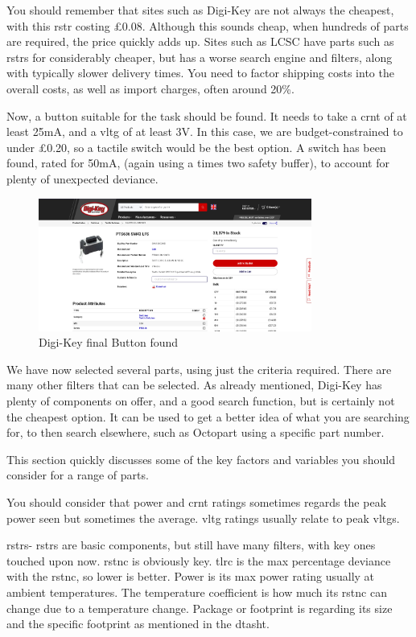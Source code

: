 \documentclass[a4paper,11pt]{report}
\begin{document}
You should remember that sites such as Digi-Key are not always the cheapest, with this \gls{rstr} costing £0.08. Although this sounds cheap, when hundreds of parts are required, the price quickly adds up. Sites such as LCSC have parts such as \gls{rstr}s for considerably cheaper, but has a worse search engine and filters, along with typically slower delivery times. You need to factor shipping costs into the overall costs, as well as import charges, often around 20\%.

Now, a button suitable for the task should be found. It needs to take a \gls{crnt} of at least 25mA, and a \gls{vltg} of at least 3V. In this case, we are budget-constrained to under £0.20, so a tactile switch would be the best option. A switch has been found, rated for 50mA, (again using a times two safety buffer), to account for plenty of unexpected deviance.

\begin{figure}[H]
\centering
\includegraphics[width=0.8\textwidth]{screenshots/DigiKeyButton}
\caption{Digi-Key final Button found}
\end{figure}

We have now selected several parts, using just the criteria required. There are many other filters that can be selected. As already mentioned, Digi-Key has plenty of components on offer, and a good search function, but is certainly not the cheapest option. It can be used to get a better idea of what you are searching for, to then search elsewhere, such as Octopart using a specific part number.

This section quickly discusses some of the key factors and variables you should consider for a range of parts.

You should consider that power and \gls{crnt} ratings sometimes regards the peak power seen but sometimes the average. \gls{vltg} ratings usually relate to peak \gls{vltg}s.

\gls{rstr}s- \gls{rstr}s are basic components, but still have many filters, with key ones touched upon now. \gls{rstnc} is obviously key. \gls{tlrc} is the max percentage deviance with the \gls{rstnc}, so lower is better. Power is its max power rating usually at ambient temperatures. The temperature coefficient is how much its \gls{rstnc} can change due to a temperature change. Package or footprint is regarding its size and the specific footprint as mentioned in the \gls{dtasht}.
\end{document}

